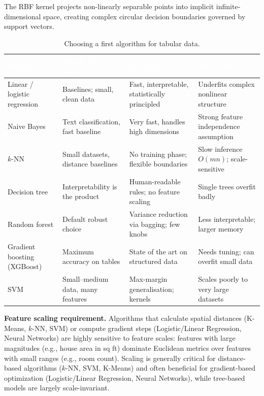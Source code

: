 \documentclass[11pt,a4paper]{article}
\begin{document}
	\begin{practicebox}

		The RBF kernel projects non-linearly separable points into implicit infinite-dimensional space, creating complex circular decision boundaries governed by support vectors.
	\end{practicebox}
	
	\begin{table}[ht]
		\centering
		\small\sffamily
		\renewcommand{\arraystretch}{1.3}
		\caption{Choosing a first algorithm for tabular data.}
		\begin{tabular}{@{}L{3.1cm} L{3.3cm} L{3.9cm} L{3.9cm}@{}}
			\toprule
			\textcolor{white}{\textbf{Algorithm}} &
			\textcolor{white}{\textbf{Reach for it when}} &
			\textcolor{white}{\textbf{Strengths}} &
			\textcolor{white}{\textbf{Watch out}} \\
			\midrule
			Linear / logistic regression & Baselines; small, clean data & Fast, interpretable, statistically principled & Underfits complex nonlinear structure \\
			Naive Bayes & Text classification, fast baseline & Very fast, handles high dimensions & Strong feature independence assumption \\
			$k$-NN & Small datasets, distance baselines & No training phase; flexible boundaries & Slow inference $O(mn)$; scale-sensitive \\
			Decision tree & Interpretability is the product & Human-readable rules; no feature scaling & Single trees overfit badly \\
			Random forest & Default robust choice & Variance reduction via bagging; few knobs & Less interpretable; larger memory \\
			Gradient boosting (XGBoost) & Maximum accuracy on tables & State of the art on structured data & Needs tuning; can overfit small data \\
			SVM & Small--medium data, many features & Max-margin generalisation; kernels & Scales poorly to very large datasets \\
			\bottomrule
		\end{tabular}
	\end{table}

	\textbf{Feature scaling requirement.} Algorithms that calculate spatial distances (K-Means, $k$-NN, SVM) or compute gradient steps (Logistic/Linear Regression, Neural Networks) are highly sensitive to feature scales: features with large magnitudes (e.g., house area in sq ft) dominate Euclidean metrics over features with small ranges (e.g., room count). Scaling is generally critical for distance-based algorithms ($k$-NN, SVM, K-Means) and often beneficial for gradient-based optimization (Logistic/Linear Regression, Neural Networks), while tree-based models are largely scale-invariant.
	
\end{document}
